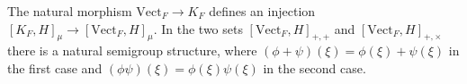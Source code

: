 The natural morphism $\text{Vect}_F \rightarrow K_F$ defines an injection $[K_F, H]_\mu \rightarrow [\text{Vect}_F, H]_\mu$. In the two sets $[\text{Vect}_F, H]_{+,+}$ and $[\text{Vect}_F, H]_{+,\times}$ there is a natural semigroup structure, where $(\phi + \psi)(\xi) = \phi(\xi) + \psi(\xi)$ in the first case and $(\phi\psi)(\xi) = \phi(\xi)\psi(\xi)$ in the second case.
